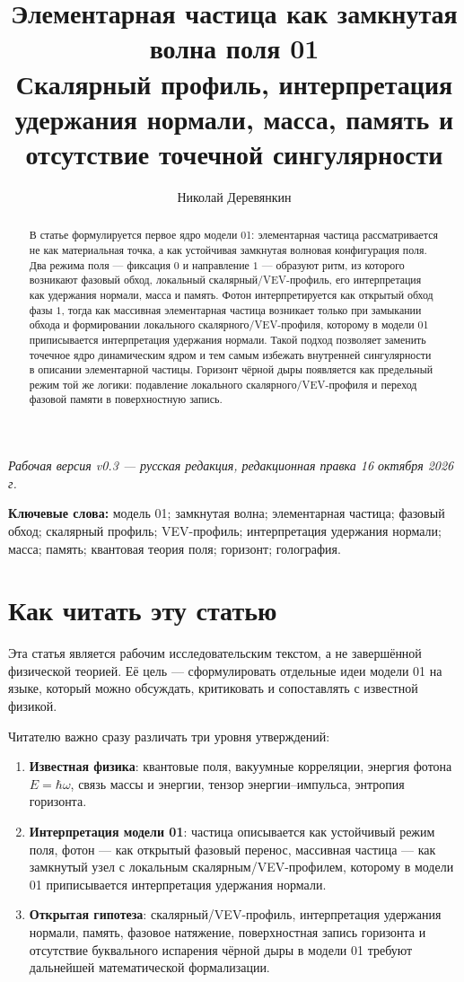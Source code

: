 \documentclass[11pt,a4paper]{article}
\title{Элементарная частица как замкнутая волна поля 01\\\large Скалярный профиль, интерпретация удержания нормали, масса, память и отсутствие точечной сингулярности}
\author{Николай Деревянкин}
\date{}
\begin{document}
\maketitle

\begin{center}
\textit{Рабочая версия v0.3 --- русская редакция, редакционная правка 16 октября 2026 г.}
\end{center}

\begin{abstract}
В статье формулируется первое ядро модели 01: элементарная частица рассматривается не как материальная точка, а как устойчивая замкнутая волновая конфигурация поля. Два режима поля --- фиксация $0$ и направление $1$ --- образуют ритм, из которого возникают фазовый обход, локальный скалярный/VEV-профиль, его интерпретация как удержания нормали, масса и память. Фотон интерпретируется как открытый обход фазы $1$, тогда как массивная элементарная частица возникает только при замыкании обхода и формировании локального скалярного/VEV-профиля, которому в модели 01 приписывается интерпретация удержания нормали. Такой подход позволяет заменить точечное ядро динамическим ядром и тем самым избежать внутренней сингулярности в описании элементарной частицы. Горизонт чёрной дыры появляется как предельный режим той же логики: подавление локального скалярного/VEV-профиля и переход фазовой памяти в поверхностную запись.
\end{abstract}

\textbf{Ключевые слова:} модель 01; замкнутая волна; элементарная частица; фазовый обход; скалярный профиль; VEV-профиль; интерпретация удержания нормали; масса; память; квантовая теория поля; горизонт; голография.

\section{Как читать эту статью}

Эта статья является рабочим исследовательским текстом, а не завершённой физической теорией. Её цель --- сформулировать отдельные идеи модели 01 на языке, который можно обсуждать, критиковать и сопоставлять с известной физикой.

Читателю важно сразу различать три уровня утверждений:
\begin{enumerate}
\item \textbf{Известная физика}: квантовые поля, вакуумные корреляции, энергия фотона $E=\hbar\omega$, связь массы и энергии, тензор энергии--импульса, энтропия горизонта.
\item \textbf{Интерпретация модели 01}: частица описывается как устойчивый режим поля, фотон --- как открытый фазовый перенос, массивная частица --- как замкнутый узел с локальным скалярным/VEV-профилем, которому в модели 01 приписывается интерпретация удержания нормали.
\item \textbf{Открытая гипотеза}: скалярный/VEV-профиль, интерпретация удержания нормали, память, фазовое натяжение, поверхностная запись горизонта и отсутствие буквального испарения чёрной дыры в модели 01 требуют дальнейшей математической формализации.
\end{enumerate}
\end{document}
